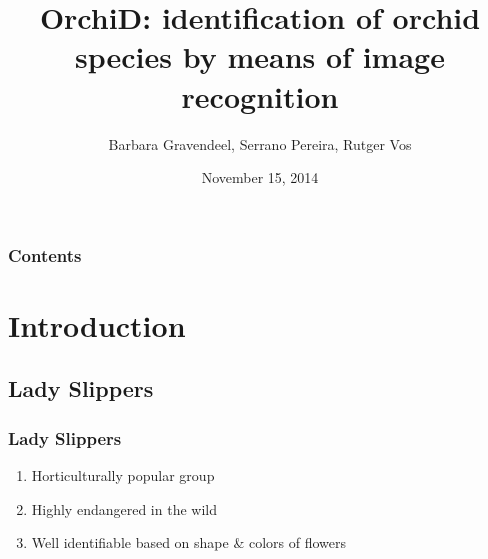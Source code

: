 \documentclass[]{beamer}
\title[OrchiD]
    {OrchiD: identification of orchid species by means of image recognition}
\author[Gravendeel, Pereira, Vos]
    {Barbara Gravendeel\inst{1}, Serrano Pereira\inst{1}, Rutger Vos\inst{1}}
\institute[Naturalis Biodiversity Center]
{
  \inst{1}
  Naturalis Biodiversity Center, The Netherlands
}
\date{November 15, 2014}
\begin{document}
\frame{\titlepage}

\begin{frame}
\frametitle{Contents}
\tableofcontents
\end{frame}

\section{Introduction}

    \subsection{Lady Slippers}

    \begin{frame}
        \frametitle{Lady Slippers}

        \begin{enumerate}
            \item Horticulturally popular group
            \item Highly endangered in the wild
            \item Well identifiable based on shape \& colors of flowers
        \end{enumerate}


\end{frame}
\end{document}
